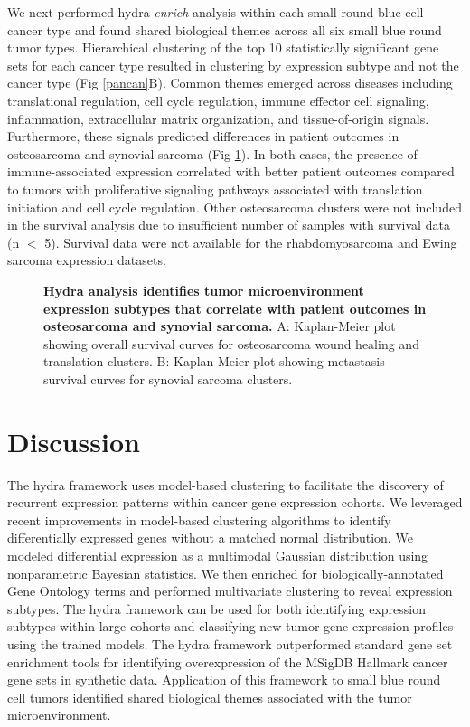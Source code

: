 \documentclass[10pt,letterpaper]{article}
\begin{document}
We next performed hydra \textit{enrich} analysis within each small round blue cell cancer type and found shared biological themes across all six small blue round tumor types. Hierarchical clustering of the top 10 statistically significant gene sets for each cancer type resulted in clustering by expression subtype and not the cancer type (Fig \ref{pancan}B). Common themes emerged across diseases including translational regulation, cell cycle regulation, immune effector cell signaling, inflammation, extracellular matrix organization, and tissue-of-origin signals. Furthermore, these signals predicted differences in patient outcomes in osteosarcoma and synovial sarcoma (Fig \ref{surv}). In both cases, the presence of immune-associated expression correlated with better patient outcomes compared to tumors with proliferative signaling pathways associated with translation initiation and cell cycle regulation. Other osteosarcoma clusters were not included in the survival analysis due to insufficient number of samples with survival data (n $<$ 5). Survival data were not available for the rhabdomyosarcoma and Ewing sarcoma expression datasets.

%
%

\begin{figure}[!h]
	\caption{{\bf Hydra analysis identifies tumor microenvironment expression subtypes that correlate with patient outcomes in osteosarcoma and synovial sarcoma.} A: Kaplan-Meier plot showing overall survival curves for osteosarcoma wound healing and translation clusters. B: Kaplan-Meier plot showing metastasis survival curves for synovial sarcoma clusters.}
	\label{surv}
\end{figure}

\section*{Discussion}
The hydra framework uses model-based clustering to facilitate the discovery of recurrent expression patterns within cancer gene expression cohorts. We leveraged recent improvements in model-based clustering algorithms to identify differentially expressed genes without a matched normal distribution. We modeled differential expression as a multimodal Gaussian distribution using nonparametric Bayesian statistics. We then enriched for biologically-annotated Gene Ontology terms and performed multivariate clustering to reveal expression subtypes. The hydra framework can be used for both identifying expression subtypes within large cohorts and classifying new tumor gene expression profiles using the trained models. The hydra framework outperformed standard gene set enrichment tools for identifying overexpression of the MSigDB Hallmark cancer gene sets in synthetic data. Application of this framework to small blue round cell tumors identified shared biological themes associated with the tumor microenvironment.
\end{document}
